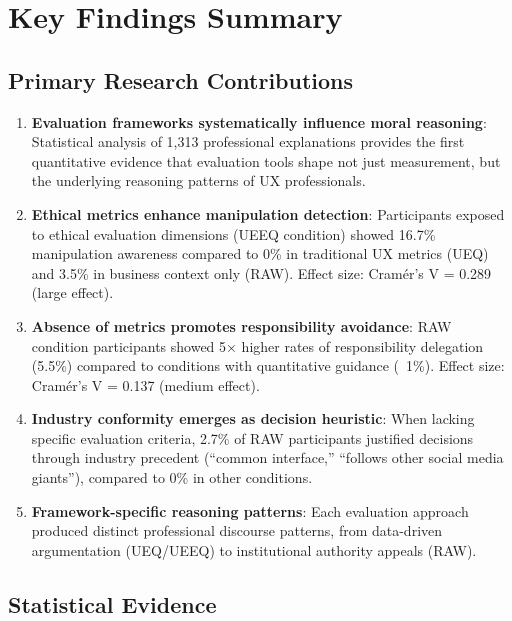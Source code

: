 
\section{Key Findings Summary}

\subsection{Primary Research Contributions}

\begin{enumerate}

\item \textbf{Evaluation frameworks systematically influence moral reasoning}: Statistical analysis of 1,313 professional explanations provides the first quantitative evidence that evaluation tools shape not just measurement, but the underlying reasoning patterns of UX professionals.

\item \textbf{Ethical metrics enhance manipulation detection}: Participants exposed to ethical evaluation dimensions (UEEQ condition) showed 16.7\% manipulation awareness compared to 0\% in traditional UX metrics (UEQ) and 3.5\% in business context only (RAW). Effect size: Cramér's V = 0.289 (large effect).

\item \textbf{Absence of metrics promotes responsibility avoidance}: RAW condition participants showed 5× higher rates of responsibility delegation (5.5\%) compared to conditions with quantitative guidance (~1\%). Effect size: Cramér's V = 0.137 (medium effect).

\item \textbf{Industry conformity emerges as decision heuristic}: When lacking specific evaluation criteria, 2.7\% of RAW participants justified decisions through industry precedent (``common interface,'' ``follows other social media giants''), compared to 0\% in other conditions.

\item \textbf{Framework-specific reasoning patterns}: Each evaluation approach produced distinct professional discourse patterns, from data-driven argumentation (UEQ/UEEQ) to institutional authority appeals (RAW).

\end{enumerate}

\subsection{Statistical Evidence}

